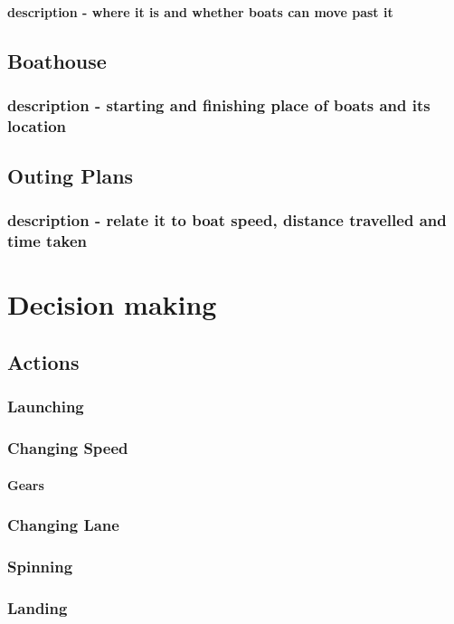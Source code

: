         \paragraph{description - where it is and whether boats can move past it}
        
    \subsection{Boathouse}
      \subsubsection{description - starting and finishing place of boats and its location}
    
    \subsection{Outing Plans}
      \subsubsection{description - relate it to boat speed, distance travelled and time taken}
    
  \section{Decision making}
    \subsection{Actions}
      \subsubsection{Launching}
      \subsubsection{Changing Speed}
        \paragraph{Gears}
      \subsubsection{Changing Lane}
      \subsubsection{Spinning}
      \subsubsection{Landing}
    
